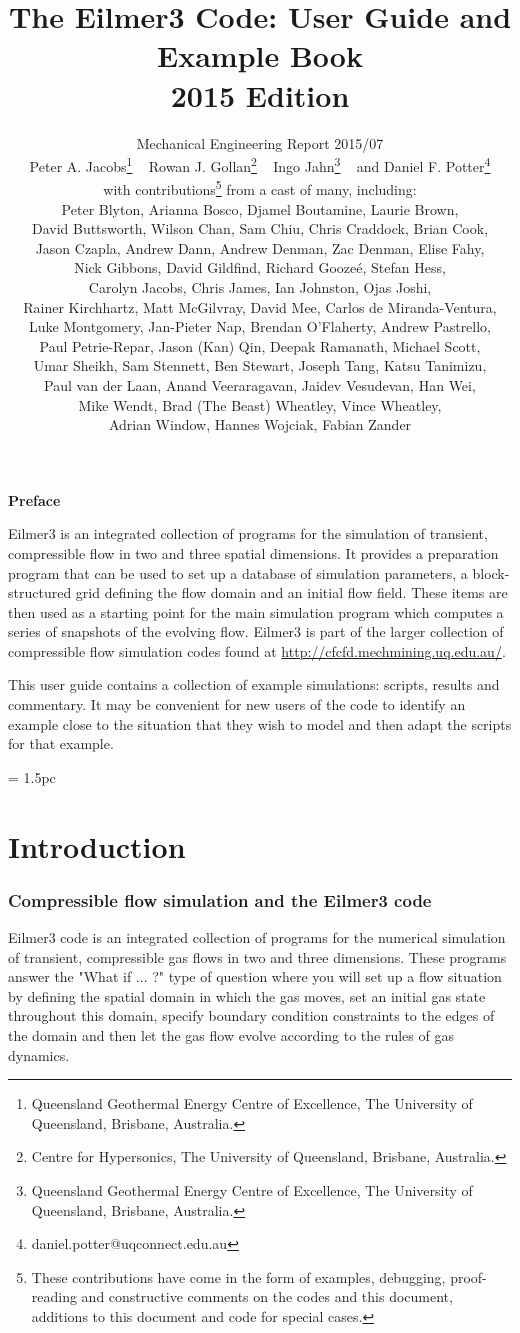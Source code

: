 \documentclass[12pt,a4paper,twoside]{article}
\title{
    The Eilmer3 Code: User Guide and Example Book\\
    2015 Edition
}
\author{
    Mechanical Engineering Report 2015/07\\
    Peter A. Jacobs\thanks{Queensland Geothermal Energy Centre of Excellence, The University of Queensland, Brisbane, Australia.} 
    ~ Rowan J. Gollan\thanks{Centre for Hypersonics, The University of Queensland, Brisbane, Australia.}
    ~ Ingo Jahn\thanks{Queensland Geothermal Energy Centre of Excellence, The University of Queensland, Brisbane, Australia.} 
    ~ and
    Daniel F. Potter\thanks{daniel.potter@uqconnect.edu.au}\\
    {\normalsize with contributions\thanks{These contributions have come in the form of examples, debugging, 
    proof-reading and constructive comments on the codes and this document, 
    additions to this document and code for special cases.}
    from a cast of many, including:}\\
    {\normalsize Peter Blyton,}
    {\normalsize Arianna Bosco,}
    {\normalsize Djamel Boutamine,}
    {\normalsize Laurie Brown,} \\
    {\normalsize David Buttsworth,}
    {\normalsize Wilson Chan,} 
    {\normalsize Sam Chiu,}
    {\normalsize Chris Craddock,} 
    {\normalsize Brian Cook,} \\ 
    {\normalsize Jason Czapla,}
    {\normalsize Andrew Dann,}  
    {\normalsize Andrew Denman,}
    {\normalsize Zac Denman,}
    {\normalsize Elise Fahy,} \\
    {\normalsize Nick Gibbons,} 
    {\normalsize David Gildfind,} 
    {\normalsize Richard Gooze\'{e},}
    {\normalsize Stefan Hess,} \\
    {\normalsize Carolyn Jacobs,} 
    {\normalsize Chris James,}
    {\normalsize Ian Johnston,}
    {\normalsize Ojas Joshi,} \\
    {\normalsize Rainer Kirchhartz,} 
    {\normalsize Matt McGilvray,} 
    {\normalsize David Mee,} 
    {\normalsize Carlos de Miranda-Ventura,} \\
    {\normalsize Luke Montgomery,} 
    {\normalsize Jan-Pieter Nap,} 
    {\normalsize Brendan O'Flaherty,} 
    {\normalsize Andrew Pastrello,} \\
    {\normalsize Paul Petrie-Repar,} 
    {\normalsize Jason (Kan) Qin,} 
    {\normalsize Deepak Ramanath,} 
    {\normalsize Michael Scott,} \\
    {\normalsize Umar Sheikh,} 
    {\normalsize Sam Stennett,}
    {\normalsize Ben Stewart,} 
    {\normalsize Joseph Tang,} 
    {\normalsize Katsu Tanimizu,} \\
    {\normalsize Paul van der Laan,} 
    {\normalsize Anand Veeraragavan,} 
    {\normalsize Jaidev Vesudevan,} 
    {\normalsize Han Wei,} \\
    {\normalsize Mike Wendt,} 
    {\normalsize Brad (The Beast) Wheatley,} 
    {\normalsize Vince Wheatley,} \\
    {\normalsize Adrian Window,} 
    {\normalsize Hannes Wojciak,}
    {\normalsize Fabian Zander}
}
\begin{document}
\maketitle

\centerline{\textbf{Preface}}
Eilmer3 is an integrated collection of programs for the simulation of transient,
compressible flow in two and three spatial dimensions.
It provides a preparation program that can be used to set up a database of
simulation parameters, a block-structured grid defining the flow domain and an
initial flow field.
These items are then used as a starting point for the main simulation program
which computes a series of snapshots of the evolving flow.
Eilmer3 is part of the larger collection of compressible flow simulation codes
found at \url{http://cfcfd.mechmining.uq.edu.au/}.

\medskip
This user guide contains a collection of example simulations: scripts, results
and commentary.
It may be convenient for new users of the code to identify an example
close to the situation that they wish to model and then adapt the 
scripts for that example.

\cleardoublepage
\tableofcontents

\cleardoublepage
\baselineskip = 1.5pc

\part{Introduction}

\section{Compressible flow simulation and the Eilmer3 code}
%
Eilmer3 code is an integrated collection of programs for the numerical simulation of transient,
compressible gas flows in two and three dimensions.
These programs answer the "What if ... ?" type of question where you will set up a flow situation by 
defining the spatial domain in which the gas moves,
set an initial gas state throughout this domain, 
specify boundary condition constraints to the edges of the domain and
then let the gas flow evolve according to the rules of gas dynamics.
\end{document}
